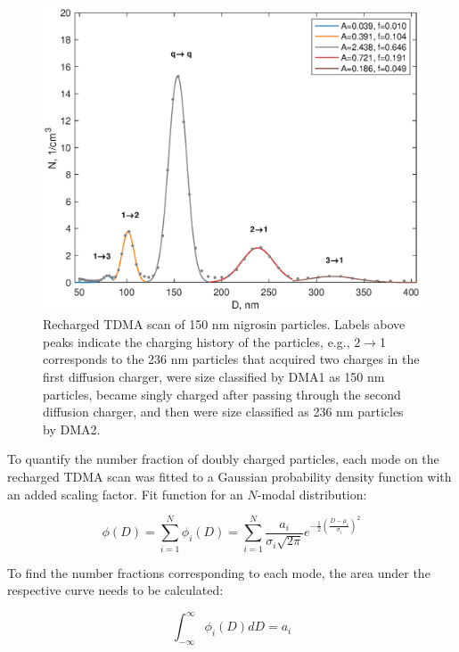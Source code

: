 \documentclass[12pt]{article}
\begin{document}
\begin{figure}[htp]
\centering
\includegraphics[scale=0.7]{images/fig_supp_recharged_nigrosin.eps}
\caption{Recharged TDMA scan of 150 nm nigrosin particles. Labels above peaks indicate the charging history of the particles, e.g., $2\rightarrow$1 corresponds to the 236 nm particles that acquired two charges in the first diffusion charger, were size classified by DMA1 as 150 nm particles, became singly charged after passing through the second diffusion charger, and then were size classified as 236 nm particles by DMA2.}
\label{s:fig:tdma}
\end{figure}

To quantify the number fraction of doubly charged particles, each mode on the recharged TDMA scan was fitted to a Gaussian probability density function with an added scaling factor. Fit function for an $N$-modal distribution:

\begin{equation}
    \phi(D)=\sum_{i=1}^{N}{\phi_i(D)}=\sum_{i=1}^{N}{\frac{a_i}{\sigma_i\sqrt{2\pi}}e^{-\frac{1}{2}\left(\frac{D-\mu_i}{\sigma_i}\right)^2}}
    \label{s:eq:gaussian-mode}
\end{equation}

\noindent To find the number fractions corresponding to each mode, the area under the respective curve needs to be calculated:

\begin{equation}
    \int_{-\infty}^\infty{\phi_i(D)dD}=a_i
\end{equation}
\end{document}
